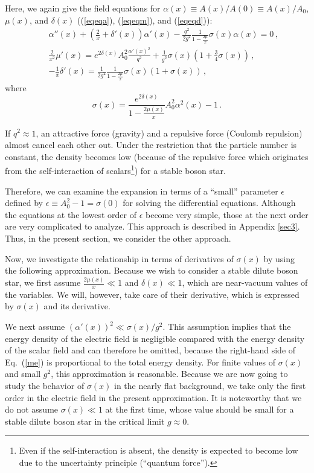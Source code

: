 \documentclass[
aps,prd,
12pt,%
nopreprintnumbers,
showpacs,
eqsecnum,
nofootinbib
]{revtex4-1}
\begin{document}
Here, we again give the field equations for $\alpha(x)\equiv
A(x)/A(0)\equiv A(x)/A_0$,
$\mu(x)$, and
$\delta(x)$ ((\ref{eqeqa}), (\ref{eqeqm}), and (\ref{eqeqd})):
\begin{eqnarray}
& &\alpha''(x)+\left(\frac{2}{x}+\delta'(x)\right)\alpha'(x)-\frac{q^2}{2g^2}
\frac{1}{1-\frac{2\mu}{x}}\sigma(x)\alpha(x)=0\,,
\label{ae}\\
& &\frac{2}{x^2}\mu'(x)=e^{2\delta(x)}A_0^2\frac{{\alpha'(x)}^2}{q^2}
+\frac{1}{g^2}\sigma(x)\left(1+\frac{3}{4}\sigma(x)\right)\,,
\label{me}\\
& &-\frac{1}{x}\delta'(x)=\frac{1}{2g^2}
\frac{1}{1-\frac{2\mu}{x}}{\sigma(x)(1+\sigma(x))}
\label{de}\,,
\end{eqnarray}
where
\begin{equation}
\sigma(x)=\frac{e^{2\delta(x)}}{1-\frac{2\mu(x)}{x}}A_0^2
\alpha^2(x)-1\,.
\label{ss}
\end{equation}

If $q^2\approx 1$, an attractive force (gravity) and
a repulsive force (Coulomb repulsion) almost cancel each
other out. Under the restriction that the particle number is constant, the density
becomes low (because of the repulsive force which originates from the
self-interaction of scalars\footnote{Even if the self-interaction is absent, the
density is expected to become low due to the uncertainty principle (``quantum
force'').}) for a stable boson star.

Therefore, we can examine the expansion in terms of a ``small'' parameter
$\epsilon$ defined by $\epsilon\equiv{A_0^2-1}=\sigma(0)$ for solving the
differential equations. Although the equations at the lowest order of $\epsilon$
become very simple, those at the next order are very complicated to analyze.
This approach is described in Appendix \ref{sec3}.
Thus, in the present section, we consider the other approach.

Now, we investigate the relationship in terms of derivatives of $\sigma(x)$ by
using the following approximation. 
Because we wish to consider a stable dilute boson star, we first assume 
$\frac{2\mu(x)}{x}\ll 1$ and
$\delta(x)\ll 1$, which are near-vacuum values of
the variables. We will, however, take care of their derivative, which is
expressed by
$\sigma(x)$ and its derivative.

We next assume 
$(\alpha'(x))^2\ll\sigma(x)/g^2$. This assumption implies that the energy density
of the electric field is negligible compared with the energy density of the scalar
field and can therefore be omitted, because the right-hand side of Eq.~(\ref{me})
is proportional to the total energy density. For finite values of $\sigma(x)$ and
small $g^2$, this approximation is reasonable. Because we are now going to study
the behavior of
$\sigma(x)$ in the nearly flat background, we take only the first order in the
electric field in the present
approximation.  It is noteworthy that we do not assume $\sigma(x)\ll 1$ at the
first time, whose value should be small for a stable dilute boson star in the
critical limit $g\approx 0$. 
\end{document}
